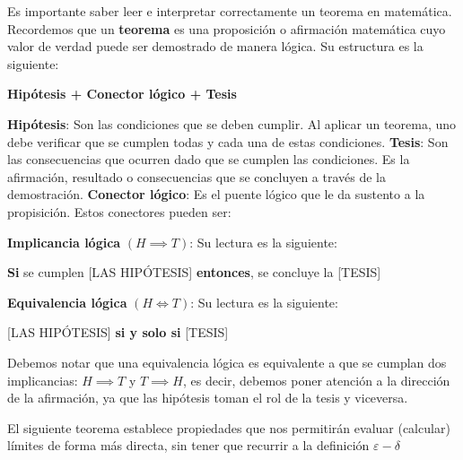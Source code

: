 \begin{notation}{}{}
  Es importante saber leer e interpretar correctamente un teorema en matemática. Recordemos que un \textbf{teorema} es una proposición o afirmación matemática cuyo valor de verdad puede ser demostrado de manera lógica. Su estructura es la siguiente:
  \begin{center}
    \textbf{Hipótesis + Conector lógico + Tesis}
  \end{center}
  \begin{itemize}
    \ii \textbf{Hipótesis}: Son las condiciones que se deben cumplir. Al aplicar un teorema, uno debe verificar que se cumplen todas y cada una de estas condiciones.
    \ii \textbf{Tesis}: Son las consecuencias que ocurren dado que se cumplen las condiciones. Es la afirmación, resultado o consecuencias que se concluyen a través de la demostración.
    \ii \textbf{Conector lógico}: Es el puente lógico que le da sustento a la propisición. Estos conectores pueden ser: 
    \begin{itemize}
      \ii \textbf{Implicancia lógica} $(H \implies T)$: Su lectura es la siguiente:
      \begin{center}
        \textbf{Si} se cumplen [LAS HIPÓTESIS] \textbf{entonces}, se concluye la [TESIS]    
      \end{center}
      \ii \textbf{Equivalencia lógica} $(H \iff T)$: Su lectura es la siguiente:
      \begin{center}
        [LAS HIPÓTESIS] \textbf{si y solo si} [TESIS]
      \end{center}
      Debemos notar que una equivalencia lógica es equivalente a que se cumplan dos implicancias: $H \implies T$ y $T \implies H$, es decir, debemos poner atención a la dirección de la afirmación, ya que las hipótesis toman el rol de la tesis y viceversa.
    \end{itemize}
  \end{itemize}
\end{notation}

El siguiente teorema establece propiedades que nos permitirán evaluar (calcular) límites de forma más directa, sin tener que recurrir a la definición $\varepsilon-\delta$

